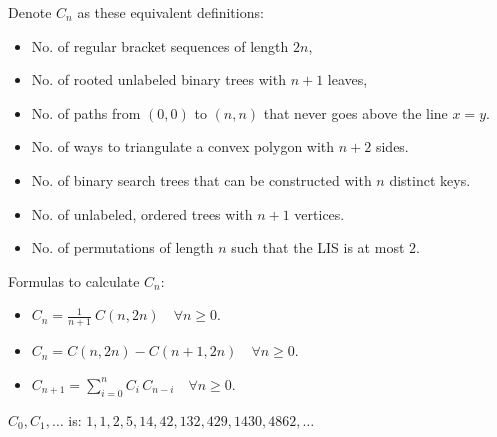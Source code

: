 Denote $C_n$ as these equivalent definitions:
\begin{itemize}
        \item No. of regular bracket sequences of length $2n$,

        \item No. of rooted unlabeled binary trees with $n+1$ leaves,

        \item No. of paths from $(0, 0)$ to $(n, n)$ that never goes above the line $x = y$.

        \item No. of ways to triangulate a convex polygon with $n+2$ sides.

        \item No. of binary search trees that can be constructed with $n$ distinct keys.

        \item No. of unlabeled, ordered trees with $n + 1$ vertices.

        \item No. of permutations of length $n$ such that the LIS is at most $2$.
\end{itemize}

Formulas to calculate $C_n$:
\begin{itemize}
        \item $\displaystyle 
                        C_n = \frac{1}{n+1} \ C(n, 2n) \quad \forall n \ge 0.$

        \item $\displaystyle 
                        C_n = C(n, 2n) - C(n + 1, 2n) \quad \forall n \ge 0.$

        \item $\displaystyle 
                        C_{n+1} = \sum_{i=0}^{n} C_i \, C_{n-i} \quad \forall n \ge 0.$
\end{itemize}

$C_0,C_1,\dotsc$ is: $1, 1, 2, 5, 14, 42, 132, 429, 1430, 4862, \dotsc$